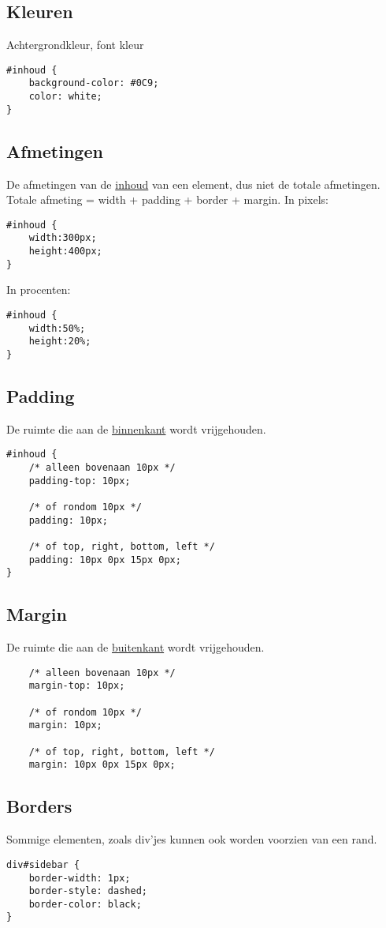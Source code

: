 \documentclass[8pt,pagesize,footinclude=false,headinclude=false]{scrartcl}
\begin{document}
\begin{multicols*}{4}
\subsection*{Kleuren}
Achtergrondkleur, font kleur
\begin{lstlisting}
#inhoud {
	background-color: #0C9;
	color: white;
}
\end{lstlisting}

\subsection*{Afmetingen}
De afmetingen van de \underline{inhoud} van een element, dus niet de totale afmetingen. Totale afmeting = width + padding + border + margin.
In pixels:
\begin{lstlisting}
#inhoud {
	width:300px;
	height:400px;
}
\end{lstlisting}

\noindent In procenten:
\begin{lstlisting}
#inhoud {
	width:50%;
	height:20%;
}
\end{lstlisting}

\subsection*{Padding}
De ruimte die aan de \underline{binnenkant} wordt vrijgehouden.
\begin{lstlisting}
#inhoud {
	/* alleen bovenaan 10px */
	padding-top: 10px; 

	/* of rondom 10px */
	padding: 10px; 

	/* of top, right, bottom, left */
	padding: 10px 0px 15px 0px; 
}
\end{lstlisting}

\subsection*{Margin}
De ruimte die aan de \underline{buitenkant} wordt vrijgehouden.
\begin{lstlisting}
	/* alleen bovenaan 10px */
	margin-top: 10px; 
	
	/* of rondom 10px */
	margin: 10px; 
	
	/* of top, right, bottom, left */
	margin: 10px 0px 15px 0px; 
\end{lstlisting}

\subsection*{Borders}
Sommige elementen, zoals div'jes kunnen ook worden voorzien van een rand.
\begin{lstlisting}
div#sidebar {
	border-width: 1px;
	border-style: dashed;
	border-color: black;
}
\end{lstlisting}


\end{multicols*}
\end{document}
